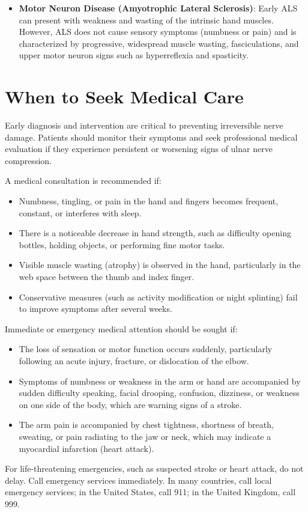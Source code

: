 \begin{itemize}
  \item \textbf{Motor Neuron Disease (Amyotrophic Lateral Sclerosis)}: Early ALS can present with weakness and wasting of the intrinsic hand muscles. However, ALS does not cause sensory symptoms (numbness or pain) and is characterized by progressive, widespread muscle wasting, fasciculations, and upper motor neuron signs such as hyperreflexia and spasticity.
\end{itemize}

\section*{When to Seek Medical Care}
Early diagnosis and intervention are critical to preventing irreversible nerve damage. Patients should monitor their symptoms and seek professional medical evaluation if they experience persistent or worsening signs of ulnar nerve compression.

A medical consultation is recommended if:
\begin{itemize}
  \item Numbness, tingling, or pain in the hand and fingers becomes frequent, constant, or interferes with sleep.
  \item There is a noticeable decrease in hand strength, such as difficulty opening bottles, holding objects, or performing fine motor tasks.
  \item Visible muscle wasting (atrophy) is observed in the hand, particularly in the web space between the thumb and index finger.
  \item Conservative measures (such as activity modification or night splinting) fail to improve symptoms after several weeks.
\end{itemize}

Immediate or emergency medical attention should be sought if:
\begin{itemize}
  \item The loss of sensation or motor function occurs suddenly, particularly following an acute injury, fracture, or dislocation of the elbow.
  \item Symptoms of numbness or weakness in the arm or hand are accompanied by sudden difficulty speaking, facial drooping, confusion, dizziness, or weakness on one side of the body, which are warning signs of a stroke.
  \item The arm pain is accompanied by chest tightness, shortness of breath, sweating, or pain radiating to the jaw or neck, which may indicate a myocardial infarction (heart attack).
\end{itemize}
For life-threatening emergencies, such as suspected stroke or heart attack, do not delay. Call emergency services immediately. In many countries, call local emergency services; in the United States, call 911; in the United Kingdom, call 999.

